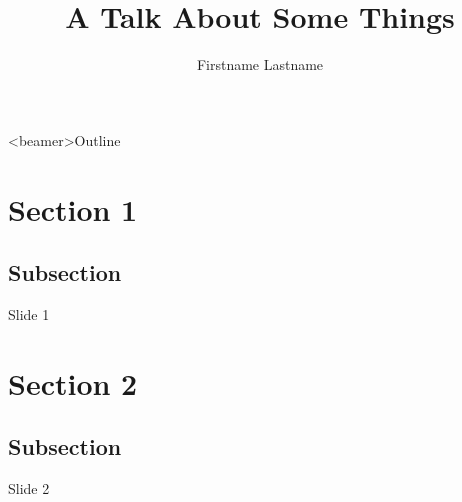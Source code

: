 \documentclass[presentation]{beamer}
\title[A Talk About Some Things] %
{A Talk About Some Things}
\author[] %
{Firstname Lastname}
\institute[The University of Cape Town] %
{
 \normalsize{Conference Name}\\
}
\begin{document}
\begin{frame}
  \titlepage
\end{frame}

\begin{frame}<beamer>{Outline}
  \tableofcontents[]
\end{frame}

\section{Section 1}
\subsection{Subsection}

\begin{frame}{Slide 1}
\end{frame}

\section{Section 2}
\subsection{Subsection}

\begin{frame}{Slide 2}
\end{frame}
\end{document}
